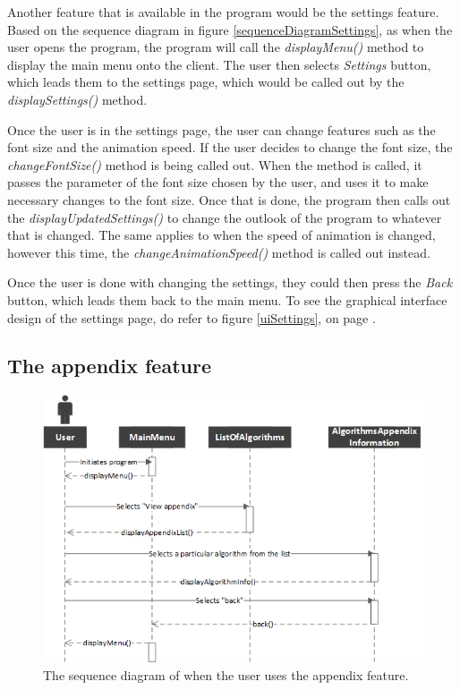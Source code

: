 Another feature that is available in the program would be the settings feature. Based on the sequence diagram in figure \ref{sequenceDiagramSettings}, as when the user opens the program, the program will call the \textit{displayMenu()} method to display the main menu onto the client. The user then selects \textit{Settings} button, which leads them to the settings page, which would be called out by the \textit{displaySettings()} method.

Once the user is in the settings page, the user can change features such as the font size and the animation speed. If the user decides to change the font size, the \textit{changeFontSize()} method is being called out. When the method is called, it passes the parameter of the font size chosen by the user, and uses it to make necessary changes to the font size. Once that is done, the program then calls out the \textit{displayUpdatedSettings()} to change the outlook of the program to whatever that is changed. The same applies to when the speed of animation is changed, however this time, the \textit{changeAnimationSpeed()} method is called out instead. 

Once the user is done with changing the settings, they could then press the \textit{Back} button, which leads them back to the main menu. To see the graphical interface design of the settings page, do refer to figure \ref{uiSettings}, on page \pageref{uiSettings}.

\newpage

\subsection{The appendix feature}

\begin{figure}[H]
\centering
\includegraphics[scale=1]{images/report_images/sequenceDiagramAppendix.png}
\caption{The sequence diagram of when the user uses the appendix feature.}
\label{sequenceDiagramAppendix}
\end{figure}


